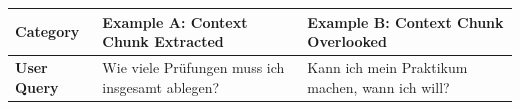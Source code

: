 \documentclass[12pt]{article} %
\begin{document}
\begin{table}[htbp]
    \centering
    \small
    \renewcommand{\arraystretch}{1.3}
    \begin{tabularx}{\textwidth}{l X X}
        \toprule
        \textbf{Category}                                                                                                                                                                                                                                                                                                                                                                                                                                                                                                                     & \textbf{Example A: Context Chunk Extracted} & \textbf{Example B: Context Chunk Overlooked} \\
        \midrule
        \textbf{User Query}                                                                                                                                                                                                                                                                                                                                                                                                                                                                                                                   &
        Wie viele Pr\"ufungen muss ich insgesamt ablegen?                                                                                                                                                                                                                                                                                                                                                                                                                                                                                     &
        Kann ich mein Praktikum machen, wann ich will?                                                                                                                                                                                                                                                                                                                                                                                                                                                                                                                                                                                              \\

\end{tabularx}
\end{table}
\end{document}
